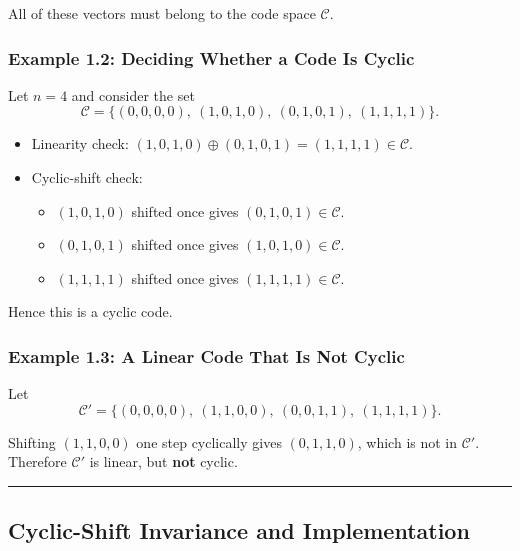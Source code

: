 \documentclass[
]{article}
\providecommand{\tightlist}{%
  \setlength{\itemsep}{0pt}\setlength{\parskip}{0pt}}
\begin{document}
All of these vectors must belong to the code space \(\mathcal{C}\).

\subsubsection{Example 1.2: Deciding Whether a Code Is
Cyclic}\label{example-1.2-deciding-whether-a-code-is-cyclic}

Let \(n=4\) and consider the set
\[\mathcal{C} = \{(0,0,0,0),\ (1,0,1,0),\ (0,1,0,1),\ (1,1,1,1)\}.\]

\begin{itemize}
\tightlist
\item
  Linearity check:
  \((1,0,1,0) \oplus (0,1,0,1) = (1,1,1,1) \in \mathcal{C}\).
\item
  Cyclic-shift check:

  \begin{itemize}
  \tightlist
  \item
    \((1,0,1,0)\) shifted once gives \((0,1,0,1) \in \mathcal{C}\).
  \item
    \((0,1,0,1)\) shifted once gives \((1,0,1,0) \in \mathcal{C}\).
  \item
    \((1,1,1,1)\) shifted once gives \((1,1,1,1) \in \mathcal{C}\).
  \end{itemize}
\end{itemize}

Hence this is a cyclic code.

\subsubsection{Example 1.3: A Linear Code That Is Not
Cyclic}\label{example-1.3-a-linear-code-that-is-not-cyclic}

Let
\[\mathcal{C}' = \{(0,0,0,0),\ (1,1,0,0),\ (0,0,1,1),\ (1,1,1,1)\}.\]

Shifting \((1,1,0,0)\) one step cyclically gives \((0,1,1,0)\), which is
not in \(\mathcal{C}'\). Therefore \(\mathcal{C}'\) is linear, but
\textbf{not} cyclic.

\begin{center}\rule{0.5\linewidth}{0.5pt}\end{center}

\subsection{Cyclic-Shift Invariance and Implementation}\label{why-is-cyclic-shift-invariance-useful-for-implementation}
\end{document}
